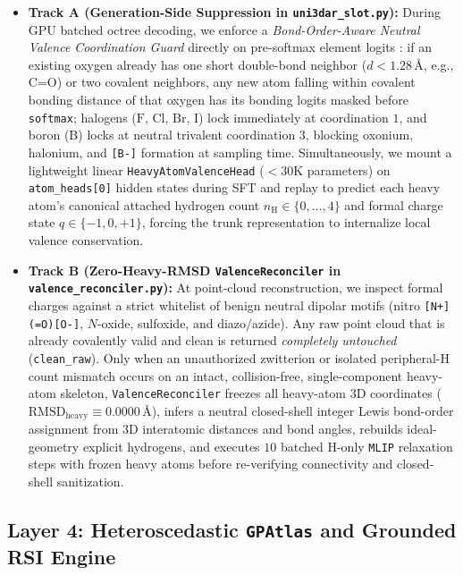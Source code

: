\documentclass[11pt,a4paper]{article}
\begin{document}
\begin{itemize}[leftmargin=1.5em,itemsep=2pt,topsep=2pt]
    \item \textbf{Track A (Generation-Side Suppression in \texttt{uni3dar\_slot.py}):} During GPU batched octree decoding, we enforce a \emph{Bond-Order-Aware Neutral Valence Coordination Guard} directly on pre-softmax element logits \citep{lu2025uni3dar}: if an existing oxygen already has one short double-bond neighbor ($d < 1.28\,\text{\AA}$, e.g., $\text{C=O}$) or two covalent neighbors, any new atom falling within covalent bonding distance of that oxygen has its bonding logits masked before \texttt{softmax}; halogens ($\text{F, Cl, Br, I}$) lock immediately at coordination $1$, and boron ($\text{B}$) locks at neutral trivalent coordination $3$, blocking oxonium, halonium, and \texttt{[B-]} formation at sampling time. Simultaneously, we mount a lightweight linear \texttt{HeavyAtomValenceHead} ($< 30\text{K}$ parameters) on \texttt{atom\_heads[0]} hidden states during SFT and replay to predict each heavy atom's canonical attached hydrogen count $n_{\text{H}} \in \{0,\dots,4\}$ and formal charge state $q \in \{-1, 0, +1\}$, forcing the trunk representation to internalize local valence conservation.
    \item \textbf{Track B (Zero-Heavy-RMSD \texttt{ValenceReconciler} in \texttt{valence\_reconciler.py}):} At point-cloud reconstruction, we inspect formal charges against a strict whitelist of benign neutral dipolar motifs (nitro \texttt{[N+](=O)[O-]}, $N$-oxide, sulfoxide, and diazo/azide). Any raw point cloud that is already covalently valid and clean is returned \emph{completely untouched} (\texttt{clean\_raw}). Only when an unauthorized zwitterion or isolated peripheral-H count mismatch occurs on an intact, collision-free, single-component heavy-atom skeleton, \texttt{ValenceReconciler} freezes all heavy-atom 3D coordinates ($\text{RMSD}_{\text{heavy}} \equiv 0.0000\,\text{\AA}$), infers a neutral closed-shell integer Lewis bond-order assignment from 3D interatomic distances and bond angles, rebuilds ideal-geometry explicit hydrogens, and executes $10$ batched H-only \texttt{MLIP} relaxation steps with frozen heavy atoms before re-verifying connectivity and closed-shell sanitization.
\end{itemize}

\subsection{Layer 4: Heteroscedastic \texttt{GPAtlas} and Grounded RSI Engine}
\label{sec:rsi}
\end{document}
